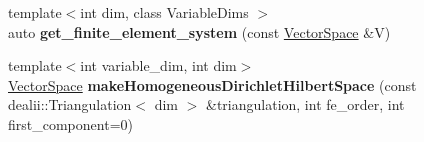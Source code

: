 \begin{DoxyCompactItemize}
\item 
\hypertarget{namespaceSpacy_1_1dealII_ae4b346126212aae19ce54381fe87f556}{{\footnotesize template$<$int dim, class Variable\-Dims $>$ }\\auto {\bfseries get\-\_\-finite\-\_\-element\-\_\-system} (const \hyperlink{classSpacy_1_1VectorSpace}{Vector\-Space} \&V)}\label{namespaceSpacy_1_1dealII_ae4b346126212aae19ce54381fe87f556}

\item 
\hypertarget{namespaceSpacy_1_1dealII_a84446cd81a46ee9162ea8944f6d92f55}{{\footnotesize template$<$int variable\-\_\-dim, int dim$>$ }\\\hyperlink{classSpacy_1_1VectorSpace}{Vector\-Space} {\bfseries make\-Homogeneous\-Dirichlet\-Hilbert\-Space} (const dealii\-::\-Triangulation$<$ dim $>$ \&triangulation, int fe\-\_\-order, int first\-\_\-component=0)}\label{namespaceSpacy_1_1dealII_a84446cd81a46ee9162ea8944f6d92f55}


\end{DoxyCompactItemize}
